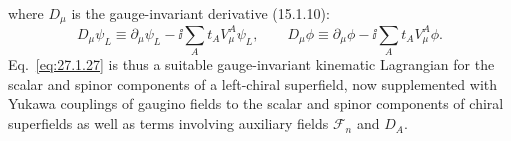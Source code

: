 where \(D_\mu\) is the gauge-invariant derivative (15.1.10):
\begin{equation}
  D_\mu\psi_L\equiv
  \partial_\mu\psi_L-\ii\sum_A t_AV^A_\mu\psi_L,
  \qquad
  D_\mu\phi\equiv
  \partial_\mu\phi-\ii\sum_A t_AV^A_\mu\phi.
  \tag{27.1.28}\label{eq:27.1.28}
\end{equation}
Eq.~\eqref{eq:27.1.27} is thus a suitable gauge-invariant kinematic
Lagrangian for the scalar and spinor components of a left-chiral
superfield, now supplemented with Yukawa couplings of gaugino fields to
the scalar and spinor components of chiral superfields as well as terms
involving auxiliary fields \(\mathcal{F}_n\) and \(D_A\).
